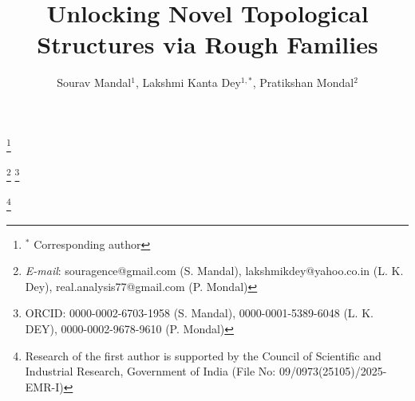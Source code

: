 \documentclass[11pt]{amsart}
\begin{document}
\large


\theoremstyle{plain}
\newtheorem{theorem}{Theorem}[section]

\newtheorem{prop}[theorem]{Proposition}

\newtheorem{lemma}{Lemma}[section]
\newtheorem{corollary}{Corollary}

\theoremstyle{definition}
\newtheorem{definition}{Definition}[section]
\newtheorem{remark}{\textnormal{\textbf{Remark}}}
\newtheorem{proposition}{\textnormal{\textbf{Proposition}}}
\newtheorem*{acknowledgement}{\textnormal{\textbf{Acknowledgement}}}
\theoremstyle{remark}
\newtheorem{example}{Example}
\newtheorem*{question}{\textnormal{\textbf{Open question}}}


\title[Unlocking Novel Topological Structures via Rough Families]{Unlocking Novel Topological Structures via Rough Families}

\author[Sourav Mandal, Lakshmi Kanta Dey, Pratikshan Mondal]{Sourav Mandal$^1$, Lakshmi Kanta Dey$^{1,*}$, Pratikshan Mondal$^2$}


\thanks{$^*$ Corresponding author}


\address{$^1$Department of Mathematics, National Institute of Technology Durgapur, 713209, West Bengal, India.}

\address{$^2$Department of Mathematics, Acharya Brojendra Nath Seal College, Cooch Behar, 736101, West Bengal, India.}

 \thanks{\emph{E-mail}: souragence@gmail.com (S. Mandal), lakshmikdey@yahoo.co.in (L. K. Dey), real.analysis77@gmail.com (P. Mondal)}
 \thanks{ORCID: 0000-0002-6703-1958 (S. Mandal), 0000-0001-5389-6048 (L. K. DEY), 0000-0002-9678-9610 (P. Mondal)}
\date{}



\date{}

\thanks{Research of the first author is supported by the
Council of Scientific and Industrial Research, Government of India (File No:
09/0973(25105)/2025-EMR-I)}
\end{document}
